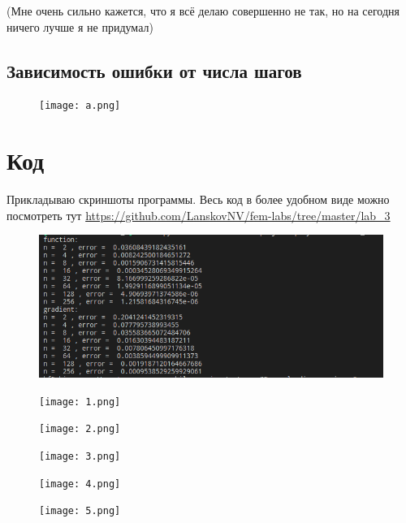 \documentclass[12pt]{article}
\begin{document}
(Мне очень сильно кажется, что я всё делаю совершенно не так, но на сегодня ничего лучше я не придумал)

\subsection{Зависимость ошибки от числа шагов}

\begin{figure}[H] \label{fig1}
\centerline{\texttt{[image: a.png]}}
\end{figure} 

\section{Код}

Прикладываю скриншоты программы. Весь код в более удобном виде можно посмотреть тут
\url{https://github.com/LanskovNV/fem-labs/tree/master/lab_3}

\begin{figure}[H] \label{fig1}
\centerline{\includegraphics[scale = 0.8]{0.png}}
\end{figure} 

\begin{figure}[H] \label{fig1}
\centerline{\texttt{[image: 1.png]}}
\end{figure} 

\begin{figure}[H] \label{fig1}
\centerline{\texttt{[image: 2.png]}}
\end{figure} 

\begin{figure}[H] \label{fig1}
\centerline{\texttt{[image: 3.png]}}
\end{figure} 

\begin{figure}[H] \label{fig1}
\centerline{\texttt{[image: 4.png]}}
\end{figure} 

\begin{figure}[H] \label{fig1}
\centerline{\texttt{[image: 5.png]}}
\end{figure} 
\end{document}
